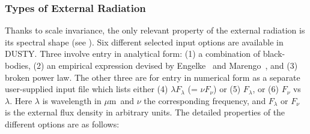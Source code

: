 \documentclass[11pt]{article}
\def\D  {{\sf DUSTY}}
\def\mic    {\hbox{$\mu$m}}
\begin{document}
\subsubsection{Types of External Radiation}
\label{type_raiation}
%
Thanks to scale invariance, the only relevant property of the external radiation
is its spectral shape (see \cite{IE97}). Six different selected input
options are available in \D. Three involve entry in analytical form:
(1) a combination of black-bodies, (2) an empirical expression devised by
Engelke~\cite{Engelk} and Marengo~\cite{Mareng}, and (3) broken power law. The other
three are for entry in numerical form as a separate user-supplied input
file which lists either (4) $\lambda F_\lambda$ (= $\nu F_\nu$) or (5)
$F_\lambda$, or (6) $F_\nu$ vs $\lambda$.  Here $\lambda$ is wavelength in \mic\
and $\nu$ the corresponding frequency, and $F_\lambda$ or $F_\nu$ is the
external flux density in arbitrary units. The detailed properties of the
different options are as follows:
\end{document}

